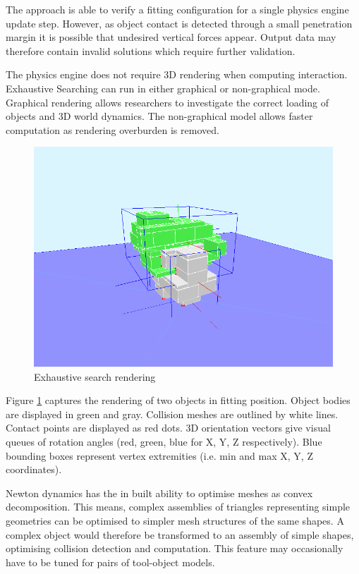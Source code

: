 \documentclass[11]{article}
\begin{document}
The approach is able to verify a fitting configuration for a single physics engine update step.
However, as object contact is detected through a small penetration margin it is possible that undesired vertical forces appear.
Output data may therefore contain invalid solutions which require further validation.

The physics engine does not require 3D rendering when computing interaction. 
Exhaustive Searching can run in either graphical or non-graphical mode.
Graphical rendering allows researchers to investigate the correct loading of objects and 3D world dynamics.
The non-graphical model allows faster computation as rendering overburden is removed. 

\begin{figure}[h]
  \centering
  \includegraphics[width=.7\textwidth]{figures/newton_simulation.png}
  \caption{Exhaustive search rendering}
  \label{fig:newton_simulation}
\end{figure}      

Figure \ref{fig:newton_simulation} captures the rendering of two objects in fitting position.
Object bodies are displayed in green and gray.
Collision meshes are outlined by white lines.
Contact points are displayed as red dots.
3D orientation vectors give visual queues of rotation angles (red, green, blue for X, Y, Z respectively).
Blue bounding boxes represent vertex extremities (i.e. min and max X, Y, Z coordinates).
 
Newton dynamics has the in built ability to optimise meshes as convex decomposition.
This means, complex assemblies of triangles representing simple geometries can be optimised to simpler mesh structures of the same shapes. 
A complex object would therefore be transformed to an assembly of simple shapes, optimising collision detection and computation. 
This feature may occasionally have to be tuned for pairs of tool-object models.
\end{document}
